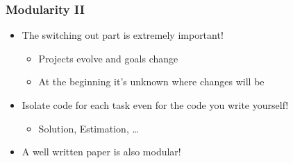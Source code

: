 \documentclass[11pt]{beamer}
\begin{document}
\begin{frame}[c]\frametitle{Modularity II}
\begin{itemize}
    \item The switching out part is extremely important!
    \begin{itemize}
        \item Projects evolve and goals change
        \item At the beginning it's unknown where changes will be
    \end{itemize}
    \item Isolate code for each task even for the code you write yourself!
    \begin{itemize}
        \item Solution, Estimation, \ldots
    \end{itemize}
    \item A well written paper is also modular!
\end{itemize}
\end{frame}









\end{document}
